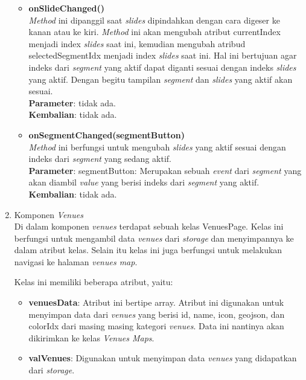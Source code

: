 \begin{enumerate}
\begin{itemize}
				\item \textbf{onSlideChanged()}\\
					\textit{Method} ini dipanggil saat \textit{slides} dipindahkan dengan cara digeser ke kanan atau ke kiri. \textit{Method} ini akan mengubah atribut currentIndex menjadi index \textit{slides} saat ini, kemudian mengubah atribud selectedSegmentIdx menjadi index \textit{slides} saat ini. Hal ini bertujuan agar indeks dari \textit{segment} yang aktif dapat diganti sesuai dengan indeks \textit{slides} yang aktif. Dengan begitu tampilan \textit{segment} dan \textit{slides} yang aktif akan sesuai. \\
					\textbf{Parameter}: tidak ada. \\
					\textbf{Kembalian}: tidak ada.
					
				\item \textbf{onSegmentChanged(segmentButton)}\\
					\textit{Method} ini berfungsi untuk mengubah \textit{slides} yang aktif sesuai dengan indeks dari \textit{segment} yang sedang aktif. \\
					\textbf{Parameter}: segmentButton: Merupakan sebuah \textit{event} dari \textit{segment} yang akan diambil \textit{value} yang berisi indeks dari \textit{segment} yang aktif. \\
					\textbf{Kembalian}: tidak ada.
			\end{itemize}
			
			\item Komponen \textit{Venues} \\
				Di dalam komponen \textit{venues} terdapat sebuah kelas VenuesPage. Kelas ini berfungsi untuk mengambil data \textit{venues} dari \textit{storage} dan menyimpannya ke dalam atribut kelas. Selain itu kelas ini juga berfungsi untuk melakukan navigasi ke halaman \textit{venues map}.
				
				Kelas ini memiliki beberapa atribut, yaitu:
				\begin{itemize}
					\item \textbf{venuesData}: Atribut ini bertipe array. Atribut ini digunakan untuk menyimpan data dari \textit{venues} yang berisi id, name, icon, geojson, dan colorIdx dari masing masing kategori \textit{venues}. Data ini nantinya akan dikirimkan ke kelas \textit{Venues Maps}.
					\item \textbf{valVenues}: Digunakan untuk menyimpan data \textit{venues} yang didapatkan dari \textit{storage}.
				\end{itemize}
				

\end{enumerate}
